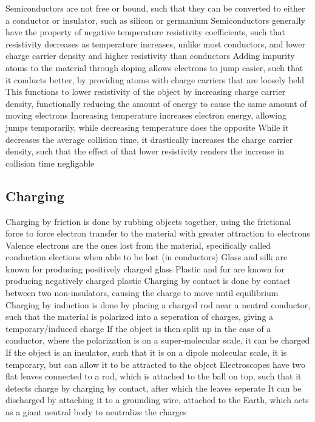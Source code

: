 \documentclass[11 pt, twoside]{article}
\newenvironment{outline*}
{
	\begin{outline}[enumerate]
	}
	{\end{outline}
}
\begin{document}
\begin{outline*}
\1 Semiconductors are not free or bound, such that they can be converted to either a conductor or insulator, such as silicon or germanium
\2 Semiconductors generally have the property of negative temperature resistivity coefficients, such that resistivity decreases as temperature increases, unlike most conductors, and lower charge carrier density and higher resistivity than conductors
\2 Adding impurity atoms to the material through doping allows electrons to jump easier, such that it conducts better, by providing atoms with charge carriers that are loosely held
\3 This functions to lower resistivity of the object by increasing charge carrier density, functionally reducing the amount of energy to cause the same amount of moving electrons
\2 Increasing temperature increases electron energy, allowing jumps temporarily, while decreasing temperature does the opposite
\3 While it decreases the average collision time, it drastically increases the charge carrier density, such that the effect of that lower resistivity renders the increase in collision time negligable
\end{outline*}

\subsection{Charging}
\begin{outline*}
\1 Charging by friction is done by rubbing objects together, using the frictional force to force electron transfer to the material with greater attraction to electrons
\2 Valence electrons are the ones lost from the material, specifically called conduction elections when able to be lost (in conductors)
\2 Glass and silk are known for producing positively charged glass
\2 Plastic and fur are known for producing negatively charged plastic
\1 Charging by contact is done by contact between two non-insulators, causing the charge to move until equilibrium
\1 Charging by induction is done by placing a charged rod near a neutral conductor, such that the material is polarized into a seperation of charges, giving a temporary/induced charge
\2 If the object is then split up in the case of a conductor, where the polarization is on a super-molecular scale, it can be charged
\2 If the object is an insulator, such that it is on a dipole molecular scale, it is temporary, but can allow it to be attracted to the object
\1 Electroscopes have two flat leaves connected to a rod, which is attached to the ball on top, such that it detects charge by charging by contact, after which the leaves seperate
\2 It can be discharged by attaching it to a grounding wire, attached to the Earth, which acts as a giant neutral body to neutralize the charges
\end{outline*}
\end{document}
